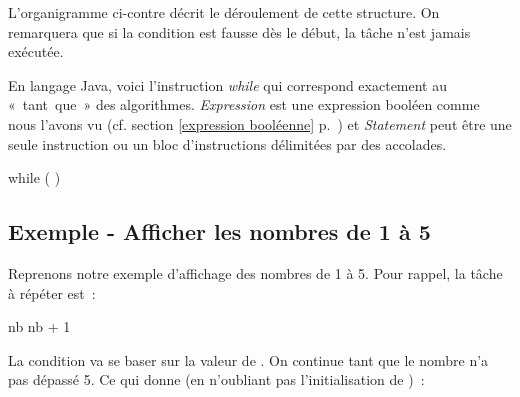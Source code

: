 	L’organigramme ci-contre décrit  le déroulement de cette structure.  On
	remarquera que si la condition est fausse dès le début, la tâche n’est
	jamais exécutée.

	En langage Java, voici l'instruction \textit{while} qui correspond
	exactement au «~tant~que~» des algorithmes. \textit{Expression} est une
	expression booléen comme nous l'avons vu (cf. section \ref{expression
	booléenne} p.~\pageref{expression booléenne}) et \textit{Statement} peut
	être une seule instruction ou un bloc d'instructions délimitées par des
	accolades.

	\begin{grammaire}
		while (  )
	\end{grammaire}


	\subsection{Exemple - Afficher les nombres de 1 à 5}

		Reprenons notre exemple d’affichage des nombres de 1 à 5.
		Pour rappel, la tâche à répéter est~:

		\begin{pseudocode}
		\Let nb \Gets nb + 1
		\end{pseudocode}
		
		La condition va se baser sur la valeur de .
		On continue tant que le nombre n’a pas dépassé 5.
		Ce qui donne (en n’oubliant pas l’initialisation de )~:

